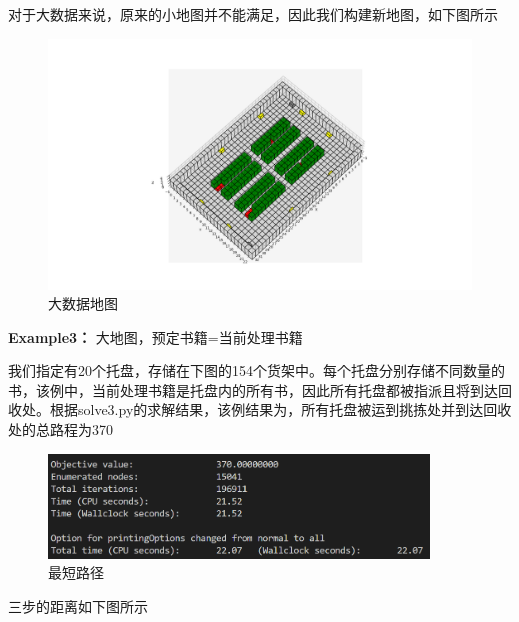 \documentclass[withoutpreface,bwprint]{thesis-config}
\begin{document}
\par 对于大数据来说，原来的小地图并不能满足，因此我们构建新地图，如下图所示

\begin{figure}[!htbp]
    \centering
    \begin{minipage}[b]{\textwidth}
        \centering
        \includegraphics[width=1\textwidth]{figures/map2.png}
        \caption{大数据地图}
    \end{minipage}
\end{figure}

\newpage
\par \textbf{Example3：} 大地图，预定书籍=当前处理书籍
\par 我们指定有20个托盘，存储在下图的154个货架中。每个托盘分别存储不同数量的书，该例中，当前处理书籍是托盘内的所有书，因此所有托盘都被指派且将到达回收处。根据solve3.py的求解结果，该例结果为，所有托盘被运到挑拣处并到达回收处的总路程为370


\begin{figure}[!htbp]
    \centering
    \begin{minipage}[b]{\linewidth}
        \centering
        \includegraphics[width=0.9\textwidth]{figures/result2.3.png}
        \caption{最短路径}
    \end{minipage}
\end{figure}

\par 三步的距离如下图所示
    
\end{document}
